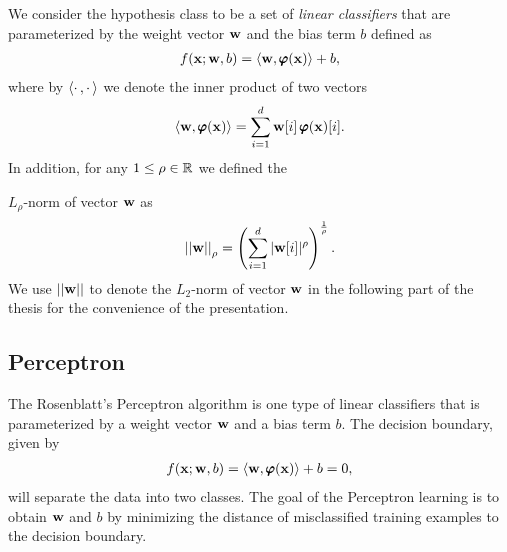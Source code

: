 We consider the hypothesis class to be a set of \textit{linear classifiers} that are parameterized by the weight vector $\mathbf {w}$ and the bias term $b$ defined as
\begin{align}
	f(\mathbf {x};\mathbf {w},b) = \langle \mathbf {w}, \pmb \varphi(\mathbf {x}) \rangle + b, \label{linearclassifier}
\end{align}
where by $\langle \cdot\,, \cdot\, \rangle$ we denote the inner product of two vectors
\begin{align*}
	\langle \mathbf {w}, \pmb \varphi(\mathbf {x}) \rangle = \sum_{i=1}^{d}\mathbf {w}[i]\,\pmb \varphi(\mathbf {x})[i].
\end{align*}
In addition, for any $1\le\rho\in\mathbb{R}$ we defined the {$L_{\rho}$-norm of vector $\mathbf {w}$ as
\begin{align*}
	\left|\left| \mathbf {w} \right|\right|_{\rho} = \left(\sum_{i=1}^{d}|\mathbf {w}[i]|^{\rho}\right)^{\frac{1}{\rho}}.
\end{align*}
We use $||\mathbf {w}||$ to denote the $L_2$-norm of vector $\mathbf {w}$ in the following part of the thesis for the convenience of the presentation.


%
%
\subsection{Perceptron}\label{sc_perceptron}

The Rosenblatt's Perceptron algorithm \citep{Rosenblatt58,Rosenblatt62} is one type of linear classifiers that is parameterized by a weight vector $\mathbf {w}$ and a bias term $b$. 
The decision boundary, given by 
\begin{align*}
	f(\mathbf {x};\mathbf {w},b) = \langle \mathbf {w}, \pmb \varphi(\mathbf {x}) \rangle + b =0,
\end{align*}
will separate the data into two classes.
The goal of the Perceptron learning is to obtain $\mathbf {w}$ and $b$ by minimizing the distance of misclassified training examples to the decision boundary.

}
